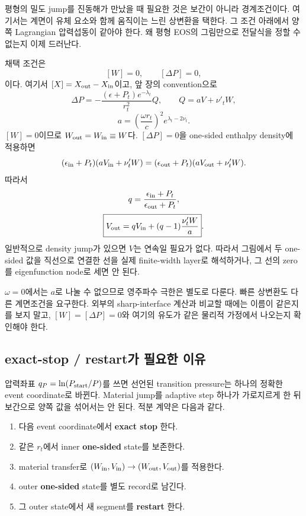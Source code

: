 \documentclass[
  10pt,
  a4paper,
]{article}
\providecommand{\tightlist}{%
  \setlength{\itemsep}{0pt}\setlength{\parskip}{0pt}}
\begin{document}
평형의 밀도 jump를 진동해가 만났을 때 필요한 것은 보간이 아니라
경계조건이다. 여기서는 계면이 유체 요소와 함께 움직이는 느린 상변환을
택한다. 그 조건 아래에서 양쪽 Lagrangian 압력섭동이 같아야 한다. 왜 평형
EOS의 그림만으로 전달식을 정할 수 없는지 이제 드러난다.

채택 조건은 \[
\boxed{[W]=0},\qquad \boxed{[\Delta P]=0},
\] 이다. 여기서 \([X]=X_{\rm out}-X_{\rm in}\)이고, 앞 장의
convention으로 \[
\Delta P=-\frac{(\epsilon+P_t)e^{-\lambda_t}}{r_t^2}Q,
\qquad
Q=aV+\nu'_tW,
\] \[
a=\left(\frac{\omega r_t}{c}\right)^2e^{\lambda_t-2\nu_t}.
\] \([W]=0\)이므로 \(W_{\rm out}=W_{\rm in}\equiv W\)다.
\([\Delta P]=0\)을 one-sided enthalpy density에 적용하면 \[
(\epsilon_{\rm in}+P_t)(aV_{\rm in}+\nu'_tW)
=(\epsilon_{\rm out}+P_t)(aV_{\rm out}+\nu'_tW).
\] 따라서 \[
q=\frac{\epsilon_{\rm in}+P_t}{\epsilon_{\rm out}+P_t},
\] \[
\boxed{V_{\rm out}=qV_{\rm in}+(q-1)\frac{\nu'_tW}{a}}.
\] 일반적으로 density jump가 있으면 \(V\)는 연속일 필요가 없다. 따라서
그림에서 두 one-sided 값을 직선으로 연결한 선을 실제 finite-width
layer로 해석하거나, 그 선의 zero를 eigenfunction node로 세면 안 된다.

\(\omega=0\)에서는 \(a\)로 나눌 수 없으므로 영주파수 극한은 별도로
다룬다. 빠른 상변환도 다른 계면조건을 요구한다. 외부의 sharp-interface
계산과 비교할 때에는 이름이 같은지를 보지 말고, \([W]=[\Delta P]=0\)와
여기의 유도가 같은 물리적 가정에서 나오는지 확인해야 한다.

\subsection{exact-stop / restart가 필요한
이유}\label{exact-stop-restartuxac00-uxd544uxc694uxd55c-uxc774uxc720}

압력좌표 \(q_P=\ln(P_{\rm start}/P)\)를 쓰면 선언된 transition
pressure는 하나의 정확한 event coordinate로 바뀐다. Material jump를
adaptive step 하나가 가로지르게 한 뒤 보간으로 양쪽 값을 섞어서는 안
된다. 적분 계약은 다음과 같다.

\begin{enumerate}
\def\labelenumi{\arabic{enumi}.}
\tightlist
\item
  다음 event coordinate에서 \textbf{exact stop} 한다.
\item
  같은 \(r_t\)에서 inner \textbf{one-sided} state를 보존한다.
\item
  material transfer로
  \((W_{\rm in},V_{\rm in})\to(W_{\rm out},V_{\rm out})\)를 적용한다.
\item
  outer \textbf{one-sided} state를 별도 record로 남긴다.
\item
  그 outer state에서 새 segment를 \textbf{restart} 한다.
\end{enumerate}
\end{document}
